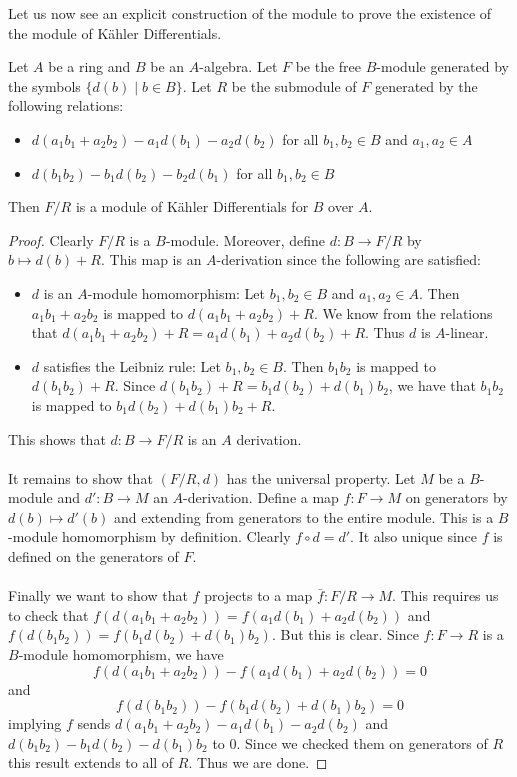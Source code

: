 \documentclass[a4paper]{article}
\begin{document}
Let us now see an explicit construction of the module to prove the existence of the module of Kähler Differentials. 

\begin{prp}{}{} Let $A$ be a ring and $B$ be an $A$-algebra. Let $F$ be the free $B$-module generated by the symbols $\{d(b)\;|\;b\in B\}$. Let $R$ be the submodule of $F$ generated by the following relations: 
\begin{itemize}
\item $d(a_1b_1+a_2b_2)-a_1d(b_1)-a_2d(b_2)$ for all $b_1,b_2\in B$ and $a_1,a_2\in A$
\item $d(b_1b_2)-b_1d(b_2)-b_2d(b_1)$ for all $b_1,b_2\in B$
\end{itemize}
Then $F/R$ is a module of Kähler Differentials for $B$ over $A$. \tcbline
\begin{proof}
Clearly $F/R$ is a $B$-module. Moreover, define $d:B\to F/R$ by $b\mapsto d(b)+R$. This map is an $A$-derivation since the following are satisfied: 
\begin{itemize}
\item $d$ is an $A$-module homomorphism: Let $b_1,b_2\in B$ and $a_1,a_2\in A$. Then $a_1b_1+a_2b_2$ is mapped to $d(a_1b_1+a_2b_2)+R$. We know from the relations that $d(a_1b_1+a_2b_2)+R=a_1d(b_1)+a_2d(b_2)+R$. Thus $d$ is $A$-linear. 
\item $d$ satisfies the Leibniz rule: Let $b_1,b_2\in B$. Then $b_1b_2$ is mapped to $d(b_1b_2)+R$. Since $d(b_1b_2)+R=b_1d(b_2)+d(b_1)b_2$, we have that $b_1b_2$ is mapped to $b_1d(b_2)+d(b_1)b_2+R$. 
\end{itemize}
This shows that $d:B\to F/R$ is an $A$ derivation. \\~\\

It remains to show that $(F/R,d)$ has the universal property. Let $M$ be a $B$-module and $d':B\to M$ an $A$-derivation. Define a map $f:F\to M$ on generators by $d(b)\mapsto d'(b)$ and extending from generators to the entire module. This is a $B$-module homomorphism by definition. Clearly $f\circ d=d'$. It also unique since $f$ is defined on the generators of $F$. \\~\\

Finally we want to show that $f$ projects to a map $\bar{f}:F/R\to M$. This requires us to check that $f(d(a_1b_1+a_2b_2))=f(a_1d(b_1)+a_2d(b_2))$ and $f(d(b_1b_2))=f(b_1d(b_2)+d(b_1)b_2)$. But this is clear. Since $f:F\to R$ is a $B$-module homomorphism, we have $$f(d(a_1b_1+a_2b_2))-f(a_1d(b_1)+a_2d(b_2))=0$$ and $$f(d(b_1b_2))-f(b_1d(b_2)+d(b_1)b_2)=0$$ implying $f$ sends $d(a_1b_1+a_2b_2)-a_1d(b_1)-a_2d(b_2)$ and $d(b_1b_2)-b_1d(b_2)-d(b_1)b_2$ to $0$. Since we checked them on generators of $R$ this result extends to all of $R$. Thus we are done. 
\end{proof}
\end{prp}
\end{document}
